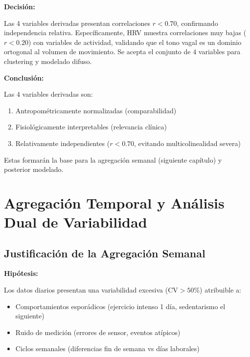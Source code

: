 \documentclass[12pt,letterpaper,twoside]{report}
\begin{document}
\begin{calculobox}
\begin{decisionbox}
\textbf{Decisión:}

Las 4 variables derivadas presentan correlaciones $r < 0.70$, confirmando independencia relativa. Específicamente, HRV muestra correlaciones muy bajas ($r < 0.20$) con variables de actividad, validando que el tono vagal es un dominio ortogonal al volumen de movimiento. Se acepta el conjunto de 4 variables para clustering y modelado difuso.
\end{decisionbox}

\begin{conclusionbox}
\textbf{Conclusión:}

Las 4 variables derivadas son:
\begin{enumerate}[noitemsep]
    \item Antropométricamente normalizadas (comparabilidad)
    \item Fisiológicamente interpretables (relevancia clínica)
    \item Relativamente independientes ($r < 0.70$, evitando multicolinealidad severa)
\end{enumerate}

Estas formarán la base para la agregación semanal (siguiente capítulo) y posterior modelado.
\end{conclusionbox}

\chapter{Agregación Temporal y Análisis Dual de Variabilidad}

\section{Justificación de la Agregación Semanal}

\begin{hipotesisbox}
\textbf{Hipótesis:}

Los datos diarios presentan una variabilidad excesiva ($\text{CV} > 50\%$) atribuible a:
\begin{itemize}[noitemsep]
    \item Comportamientos esporádicos (ejercicio intenso 1 día, sedentarismo el siguiente)
    \item Ruido de medición (errores de sensor, eventos atípicos)
    \item Ciclos semanales (diferencias fin de semana vs días laborales)
\end{itemize}


\end{hipotesisbox}
\end{calculobox}
\end{document}
